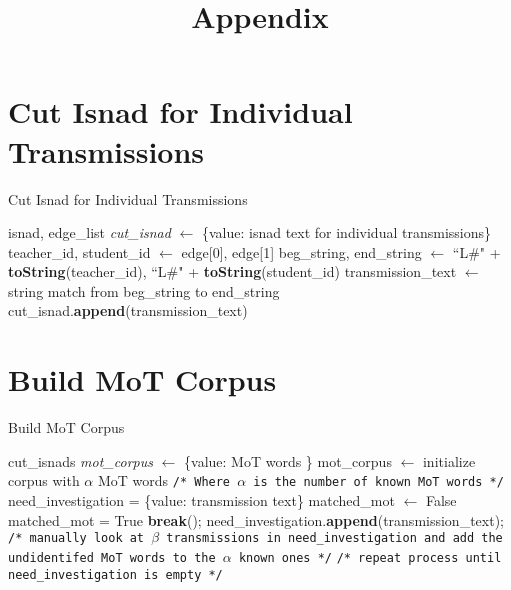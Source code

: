 \documentclass[12pt,english]{article}
\title{\textbf{Appendix}}
\date{}
\newcommand{\myindent}[1]{
\newline\makebox[#1cm]{}
}
\begin{document}
\maketitle

\section{Cut Isnad for Individual Transmissions}
\begin{center}
\begin{minipage}{.8\linewidth}
\begin{algorithm}[H]
\caption{Cut Isnad for Individual Transmissions}\label{euclid}
\begin{algorithmic}[1]
\Require isnad, edge\_list
\State \textit{cut\_isnad} $\gets$ \{value: isnad text for individual transmissions\}
\State teacher\_id, student\_id $\gets$ edge[0], edge[1]
\State beg\_string, end\_string $\gets$ ``L\#" + \textbf{toString}(teacher\_id), \myindent{4.9} ``L\#" + \textbf{toString}(student\_id)
\State transmission\_text $\gets$ string match from beg\_string to \myindent{4.17} end\_string
\State cut\_isnad.\textbf{append}(transmission\_text)
\EndForeach
\end{algorithmic}
\end{algorithm}
\end{minipage}
\end{center}

\newpage
\section{Build MoT Corpus} %
\begin{center}
\begin{minipage}{.8\linewidth}
\begin{algorithm}[H]
\caption{Build MoT Corpus}\label{euclid}
\begin{algorithmic}[1]
\Require cut\_isnads
\State \textit{mot\_corpus} $\gets$ \{value: MoT words
\}
\State mot\_corpus $\gets$ initialize corpus with $\alpha$ MoT words  \texttt{\small{/* Where $\alpha$ \myindent{2.3} is the number of known MoT words */}}
\State need\_investigation = \{value: transmission text\}
    \State matched\_mot $\gets$ False
            \State matched\_mot = True
            \State \textbf{break}();
        \EndIf 
    \EndForeach
         \State need\_investigation.\textbf{append}(transmission\_text);   
    \EndIf 
\EndForeach
{}
    \State \texttt{\small{/* manually look at $\beta$ transmissions in \myindent{.85} need\_investigation and add the undidentifed MoT \myindent{.85} words to the $\alpha$ known ones */}}
    \State \texttt{\small{/* repeat process until need\_investigation is empty */}}
\EndIf 
\end{algorithmic}
\end{algorithm}
\end{minipage}
\end{center}
\end{document}
